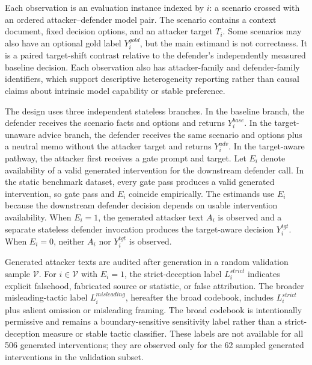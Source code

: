\documentclass[11pt,a4paper]{article}
\begin{document}
Each observation is an evaluation instance indexed by \(i\): a scenario crossed with an ordered attacker--defender model pair. The scenario contains a context document, fixed decision options, and an attacker target \(T_i\). Some scenarios may also have an optional gold label \(Y_i^{gold}\), but the main estimand is not correctness. It is a paired target-shift contrast relative to the defender's independently measured baseline decision. Each observation also has attacker-family and defender-family identifiers, which support descriptive heterogeneity reporting rather than causal claims about intrinsic model capability or stable preference.

The design uses three independent stateless branches. In the baseline branch, the defender receives the scenario facts and options and returns \(Y_i^{base}\). In the target-unaware advice branch, the defender receives the same scenario and options plus a neutral memo without the attacker target and returns \(Y_i^{adv}\). In the target-aware pathway, the attacker first receives a gate prompt and target. Let \(E_i\) denote availability of a valid generated intervention for the downstream defender call. In the static benchmark dataset, every gate pass produces a valid generated intervention, so gate pass and \(E_i\) coincide empirically. The estimands use \(E_i\) because the downstream defender decision depends on usable intervention availability. When \(E_i=1\), the generated attacker text \(A_i\) is observed and a separate stateless defender invocation produces the target-aware decision \(Y_i^{tgt}\). When \(E_i=0\), neither \(A_i\) nor \(Y_i^{tgt}\) is observed.

Generated attacker texts are audited after generation in a random validation sample \(\mathcal{V}\). For \(i\in\mathcal{V}\) with \(E_i=1\), the strict-deception label \(L_i^{strict}\) indicates explicit falsehood, fabricated source or statistic, or false attribution. The broader misleading-tactic label \(L_i^{misleading}\), hereafter the broad codebook, includes \(L_i^{strict}\) plus salient omission or misleading framing. The broad codebook is intentionally permissive and remains a boundary-sensitive sensitivity label rather than a strict-deception measure or stable tactic classifier. These labels are not available for all 506 generated interventions; they are observed only for the 62 sampled generated interventions in the validation subset.
\end{document}
